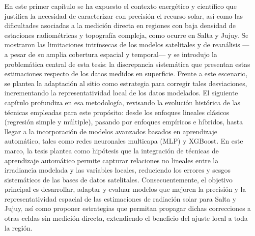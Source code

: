 En este primer capítulo se ha expuesto el contexto energético y científico que justifica la necesidad de caracterizar con precisión el recurso solar, así como las dificultades asociadas a la medición directa en regiones con baja densidad de estaciones radiométricas y topografía compleja, como ocurre en Salta y Jujuy. Se mostraron las limitaciones intrínsecas de los modelos satelitales y de reanálisis —a pesar de su amplia cobertura espacial y temporal— y se introdujo la problemática central de esta tesis: la discrepancia sistemática que presentan estas estimaciones respecto de los datos medidos en superficie. Frente a este escenario, se plantea la adaptación al sitio como estrategia para corregir tales desviaciones, incrementando la representatividad local de los datos modelados. El siguiente capítulo profundiza en esa metodología, revisando la evolución histórica de las técnicas empleadas para este propósito: desde los enfoques lineales clásicos (regresión simple y múltiple), pasando por enfoques empíricos e híbridos, hasta llegar a la incorporación de modelos avanzados basados en aprendizaje automático, tales como redes neuronales multicapa (MLP) y XGBoost. En este marco, la tesis plantea como hipótesis que la integración de técnicas de aprendizaje automático permite capturar relaciones no lineales entre la irradiancia modelada y las variables locales, reduciendo los errores y sesgos sistemáticos de las bases de datos satelitales. Consecuentemente, el objetivo principal es desarrollar, adaptar y evaluar modelos que mejoren la precisión y la representatividad espacial de las estimaciones de radiación solar para Salta y Jujuy, así como proponer estrategias que permitan propagar dichas correcciones a otras celdas sin medición directa, extendiendo el beneficio del ajuste local a toda la región.